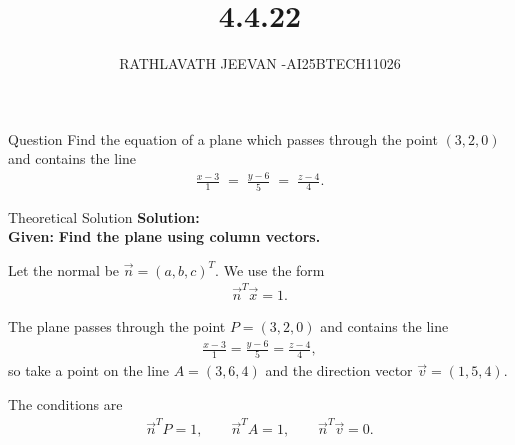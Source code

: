 \documentclass{beamer}
\title %
{4.4.22}
\author %
{RATHLAVATH JEEVAN -AI25BTECH11026}
\begin{document}
\frame{\titlepage}
\begin{frame}{Question}
Find the equation of a plane which passes through the point $(3,2,0)$ and contains the line
\begin{align}
\frac{x-3}{1} \;=\; \frac{y-6}{5} \;=\; \frac{z-4}{4}.
 \end{align}
\end{frame}
\begin{frame}{Theoretical Solution}
\textbf{Solution:}\\
 \textbf{Given:}  
\textbf{Find the plane using column vectors.}

Let the normal be \(\vec{n}=(a,b,c)^T\). We use the form
\begin{align}
\vec{n}^T\vec{x}=1.
\end{align}

The plane passes through the point \(P=(3,2,0)\) and contains the line
\begin{align}
\frac{x-3}{1}=\frac{y-6}{5}=\frac{z-4}{4},
\end{align}
so take a point on the line \(A=(3,6,4)\) and the direction vector
\(\vec{v}=(1,5,4)\).

The conditions are
\begin{align}
\vec{n}^T P = 1,\qquad \vec{n}^T A = 1,\qquad \vec{n}^T \vec{v} = 0.
\end{align}
\end{frame}
\end{document}
